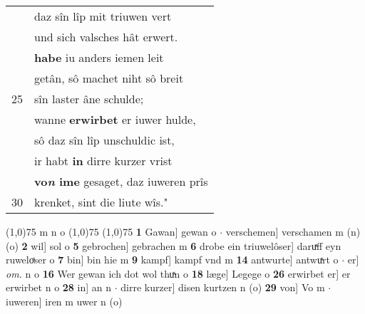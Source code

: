 \documentclass[8pt,a4paper,notitlepage]{article}
\begin{document}
\begin{table}[ht]
\begin{minipage}[t]{0.5\linewidth}
\begin{tabular}{rl}
 & daz sîn lîp mit triuwen vert\\ 
 & und sich valsches hât erwert.\\ 
 & \textbf{habe} iu anders iemen leit\\ 
 & getân, sô machet niht sô breit\\ 
25 & sîn laster âne schulde;\\ 
 & wanne \textbf{erwirbet} er iuwer hulde,\\ 
 & sô daz sîn lîp unschuldic ist,\\ 
 & ir habt \textbf{in} dirre kurzer vrist\\ 
 & \textbf{vo\textit{n} ime} gesaget, daz iuweren prîs\\ 
30 & krenket, sint die liute wîs."\\ 
\end{tabular}
\scriptsize
\line(1,0){75} \newline
m n o \newline
\line(1,0){75} \newline
\newline
\line(1,0){75} \newline
\textbf{1} Gawan] gewan o  $\cdot$ verschemen] verschamen m (n) (o) \textbf{2} wil] sol o \textbf{5} gebrochen] gebrachen m \textbf{6} drobe ein triuwelôser] daruͯff eyn ruweloͯser o \textbf{7} bin] bin hie m \textbf{9} kampf] kampf vnd m \textbf{14} antwurte] antwuͯrt o  $\cdot$ er] \textit{om.} n o \textbf{16} Wer gewan ich dot wol thuͯn o \textbf{18} læge] Legege o \textbf{26} erwirbet er] er erwirbet n o \textbf{28} in] an n  $\cdot$ dirre kurzer] disen kurtzen n (o) \textbf{29} von] Vo m  $\cdot$ iuweren] iren m uwer n (o) \newline
\end{minipage}
\end{table}
\newpage
\end{document}
